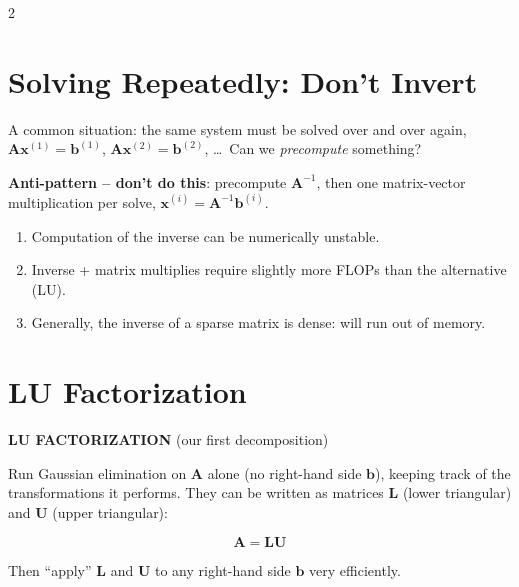 \documentclass[a4paper,9pt]{extarticle}
\begin{document}
\begin{multicols}{2}
\section{Solving Repeatedly: Don't Invert}


A common situation: the same system must be solved over and over again,
$\mathbf{A}\mathbf{x}^{(1)} = \mathbf{b}^{(1)}$, $\mathbf{A}\mathbf{x}^{(2)} = \mathbf{b}^{(2)}$,
\dots\ Can we \emph{precompute} something?


\begin{warning}

\textbf{Anti-pattern -- don't do this}: precompute $\mathbf{A}^{-1}$, then one matrix-vector
multiplication per solve, $\mathbf{x}^{(i)} = \mathbf{A}^{-1}\mathbf{b}^{(i)}$.

\begin{enumerate}

\item Computation of the inverse can be numerically unstable.

\item Inverse + matrix multiplies require slightly more FLOPs than the alternative (LU).

\item Generally, the inverse of a sparse matrix is dense: will run out of memory.

\end{enumerate}

\end{warning}



\section{LU Factorization}


\begin{definition}

\textbf{LU FACTORIZATION} (our first decomposition)

Run Gaussian elimination on $\mathbf{A}$ alone (no right-hand side $\mathbf{b}$), keeping track
of the transformations it performs. They can be written as matrices $\mathbf{L}$ (lower
triangular) and $\mathbf{U}$ (upper triangular):

\[
\mathbf{A} = \mathbf{L}\mathbf{U}
\]

Then ``apply'' $\mathbf{L}$ and $\mathbf{U}$ to any right-hand side $\mathbf{b}$ very
efficiently.


\end{definition}
\end{multicols}
\end{document}
